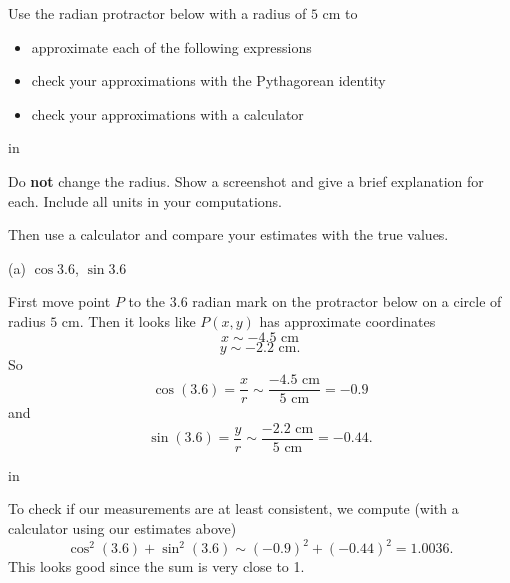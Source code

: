 \documentclass{ximera}
\newcommand{\pskip}{\vskip 0.1 in}
\begin{document}
\begin{exploration}\label{Exp1:CF}
Use the radian protractor below with a radius of $5$ cm to 
\begin{itemize}

\item{approximate each of the following expressions}

\item{check your approximations with the Pythagorean identity}

\item{check your approximations with a calculator}
\end{itemize}

\pskip

 Do {\bf not} change the radius. Show a screenshot and give a brief explanation for each. Include all units in your computations. 



Then use a calculator and compare your estimates with the true values.

(a) $\cos 3.6$, $\sin 3.6$  %

\begin{explanation}
First move point $P$ to the $3.6$ radian mark on the protractor below on a circle of radius $5$ cm. Then it looks like $P(x,y)$ has approximate coordinates
\[
     x \sim -4.5 \text{ cm}
\]
\[
    y \sim -2.2 \text{ cm} .
\]
So 
\[
   \cos (3.6) = \frac{x}{r} \sim \frac{-4.5 \text{ cm}}{5 \text{ cm}} = -0.9
\]
and 
\[
   \sin (3.6) = \frac{y}{r} \sim \frac{-2.2 \text{ cm}}{5 \text{ cm}} = -0.44 .
\]

 
\begin{onlineOnly}
    \begin{center}
\end{center}
\end{onlineOnly}

\pskip

To check if our measurements are at least consistent, we compute (with a calculator using our estimates above)
\[
   \cos^2 (3.6) + \sin^2 (3.6) \sim (-0.9)^2 + (-0.44)^2  = 1.0036 . 
\]
This looks good since the sum is very close to 1.


\end{explanation}
\end{exploration}
\end{document}
